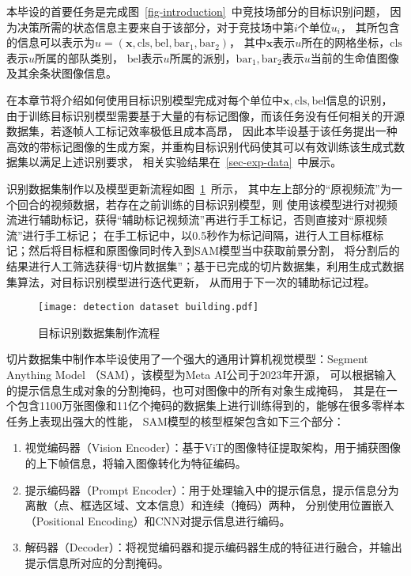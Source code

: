
\label{chpt-2}
本毕设的首要任务是完成图~\ref{fig-introduction}~中竞技场部分的目标识别问题，
因为决策所需的状态信息主要来自于该部分，对于竞技场中第$i$个单位$u_i$，
其所包含的信息可以表示为$u=(\boldsymbol{x}, \text{cls}, \text{bel}, \text{bar}_1, \text{bar}_2)$，
其中$\boldsymbol{x}$表示$u$所在的网格坐标，$\text{cls}$表示$u$所属的部队类别，
$\text{bel}$表示$u$所属的派别，$\text{bar}_1,\text{bar}_2$表示$u$当前的生命值图像及其余条状图像信息。

在本章节将介绍如何使用目标识别模型完成对每个单位中$\boldsymbol{x}, \text{cls}, \text{bel}$信息的识别，
由于训练目标识别模型需要基于大量的有标记图像，而该任务没有任何相关的开源数据集，若逐帧人工标记效率极低且成本高昂，
因此本毕设基于该任务提出一种高效的带标记图像的生成方案，并重构目标识别代码使其可以有效训练该生成式数据集以满足上述识别要求，
相关实验结果在~\ref{sec-exp-data}~中展示。

识别数据集制作以及模型更新流程如图~\ref{fig-annotation}~所示，
其中左上部分的“原视频流”为一个回合的视频数据，若存在之前训练的目标识别模型，则
使用该模型进行对视频流进行辅助标记，获得“辅助标记视频流”再进行手工标记，否则直接对“原视频流”进行手工标记；
在手工标记中，以0.5秒作为标记间隔，进行人工目标框标记；然后将目标框和原图像同时传入到SAM模型当中获取前景分割，
将分割后的结果进行人工筛选获得“切片数据集”；基于已完成的切片数据集，利用生成式数据集算法，对目标识别模型进行迭代更新，
从而用于下一次的辅助标记过程。
\begin{figure}[htbp]
  \centering
  \texttt{[image: detection dataset building.pdf]}
  \caption{目标识别数据集制作流程}
  \label{fig-annotation}
\end{figure}

切片数据集中制作本毕设使用了一个强大的通用计算机视觉模型：Segment Anything Model （SAM），该模型为Meta AI公司于2023年开源，
可以根据输入的提示信息生成对象的分割掩码，也可对图像中的所有对象生成掩码，
其是在一个包含1100万张图像和11亿个掩码的数据集上进行训练得到的，能够在很多零样本任务上表现出强大的性能，
SAM模型的核型框架包含如下三个部分：
\begin{enumerate}
  \item 视觉编码器（Vision Encoder）：基于ViT的图像特征提取架构，用于捕获图像的上下帧信息，将输入图像转化为特征编码。
  \item 提示编码器（Prompt Encoder）：用于处理输入中的提示信息，提示信息分为离散（点、框选区域、文本信息）和连续（掩码）两种，
  分别使用位置嵌入（Positional Encoding）和CNN对提示信息进行编码。
  \item 解码器（Decoder）：将视觉编码器和提示编码器生成的特征进行融合，并输出提示信息所对应的分割掩码。
\end{enumerate}

